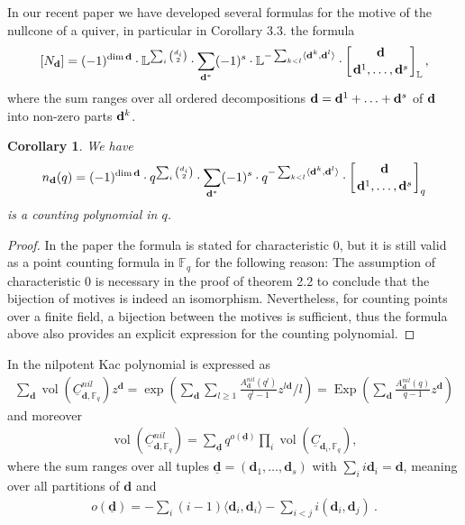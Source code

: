 \documentclass{article}
\newcommand{\bd}{\mathbf{d}}
\DeclareMathOperator{\Exp}{Exp}
\DeclareMathOperator{\vol}{vol}
\newtheorem{corollary}[theorem]{Corollary}
\begin{document}
In our recent paper \cite{motivenullcone} we have developed several formulas for the motive of the nullcone of a quiver, in particular in Corollary 3.3. the formula
\begin{align} \label{motive nullcone}
[N_{\bf d}]=(-1)^{\dim {\bf d}}\cdot\mathbb{L}^{\sum_i{d_i\choose 2}}\cdot\sum_{{\bf d}^*}(-1)^s\cdot\mathbb{L}^{-\sum_{k<l}\langle{\bf d}^k,{\bf d}^l\rangle}\cdot\left[{{\bf d}\atop{{\bf d}^1,\ldots,{\bf d}^s}}\right]_\mathbb{L},
\end{align}
where the sum ranges over all ordered decompositions ${\bf d}={\bf d}^1+\ldots+{\bf d}^s$ of ${\bf d}$ into non-zero parts ${\bf d}^k$. 
\begin{corollary}
    We have
    \begin{align*}
     n_{\bd}(q) =(-1)^{\dim {\bf d}}\cdot q^{\sum_i{d_i\choose 2}}\cdot\sum_{{\bf d}^*}(-1)^s\cdot q^{-\sum_{k<l}\langle{\bf d}^k,{\bf d}^l\rangle}\cdot\left[{{\bf d}\atop{{\bf d}^1,\ldots,{\bf d}^s}}\right]_q 
    \end{align*}
    is a counting polynomial in $q$.
\end{corollary}
\begin{proof}
In the paper the formula is stated for characteristic $0$, but it is still valid as a point counting formula in $\mathbb{F}_q$ for the following reason: The assumption of characteristic $0$ is necessary in the proof of theorem 2.2 to conclude that the bijection of motives is indeed an isomorphism. Nevertheless, for counting points over a finite field, a bijection between the motives is sufficient, thus the formula above also provides an explicit expression for the counting polynomial.
\end{proof}
In \cite{pointsnilpotentvarities} the nilpotent Kac polynomial is expressed as
\begin{align*}
    \sum_{\bd} \vol(\underline{C}^{nil}_{\bd, \mathbb{F}_q}) z^{\bd} = \exp (\sum_{\bd} \sum_{l \geq 1} \frac{A^{nil}_{\bd}(q^l)}{q^l-1}z^{l\bd}/l) = \Exp (\sum_{\bd} \frac{A^{nil}_{\bd}(q)}{q-1}z^{\bd})
\end{align*}
and moreover 
\begin{align*}
    \vol(\underline{C}^{nil}_{\bd, \mathbb{F}_q}) = \sum_{\underline{\bd}} q^{o(\underline{\bd})} \prod_i \vol (\underline{C}_{\bd_i, \mathbb{F}_q}), 
\end{align*}
where the sum ranges over all tuples $\underline{\bd}= (\bd_1, \dots, \bd_s)$ with $\sum_i i\bd_i =\bd$, meaning over all partitions of $\bd$ and 
\begin{align*}
    o(\underline{\bd}) = - \sum_i (i-1) \langle\bd_i, \bd_i \rangle - \sum_{i < j }i (\bd_i, \bd_j) ~.
\end{align*}
\end{document}
